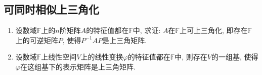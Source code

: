 \documentclass[../../main.tex]{subfiles}%
\begin{document}
\subsection{可同时相似上三角化}

\begin{proposition}[矩阵的上三角化]\label{proposition:特征值全在同一数域的矩阵可上三角化}
\begin{enumerate}
\item 设数域\(\mathbb{F}\)上的\(n\)阶矩阵\(A\)的特征值都在\(\mathbb{F}\)中, 求证: \(A\)在\(\mathbb{F}\)上可上三角化, 即存在\(\mathbb{F}\)上的可逆矩阵\(P\), 使得\(P^{-1}AP\)是上三角矩阵.
\item 设数域\(\mathbb{F}\)上线性空间\(V\)上的线性变换\(\varphi\)的特征值都在\(\mathbb{F}\)中, 则存在\(V\)的一组基, 使得\(\varphi\)在这组基下的表示矩阵是上三角矩阵. 
\end{enumerate}
\end{proposition}
\end{document}
